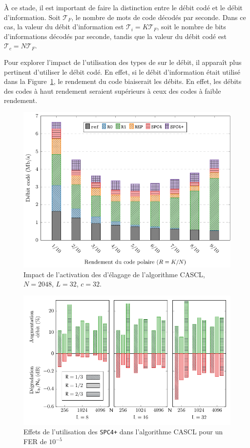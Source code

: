 \`A ce stade, il est important de faire la distinction entre le débit codé et le débit d'information. Soit $\mathcal{T}_F$, le nombre de mots de code décodés par seconde. Dans ce cas, la valeur du débit d'information est $\mathcal{T}_i=K\mathcal{T}_F$, soit le nombre de bits d'informations décodés par seconde, tandis que la valeur du débit codé est $\mathcal{T}_c=N\mathcal{T}_F$.

Pour explorer l'impact de l'utilisation des types de \noeuds sur le débit, il apparaît plus pertinent d'utiliser le débit codé. En effet, si le débit d'information était utilisé dans la Figure~\ref{fig:nodes}, le rendement du code \og biaiserait \fg les débits. En effet, les débits des codes à haut rendement seraient supérieurs à ceux des codes à faible rendement.
\begin{figure}[t]
\includegraphics[width=\textwidth]{main/ch2_fig/curves/tree/tikz/tree}
\caption{Impact de l'activation des \noeuds d'élagage de l'algorithme CASCL, $N=2048$, $L=32$, $c=32$.}
\label{fig:nodes}
\end{figure}

\begin{figure}[t]
\includegraphics[width=\textwidth]{main/ch2_fig/curves/thr_spc/tikz/thr_spc_diff}
\caption{Effets de l'utilisation des \noeuds \texttt{SPC4+} dans l'algorithme CASCL pour un FER de $10^{-5}$}
\label{fig:spc_impact}
\end{figure}

